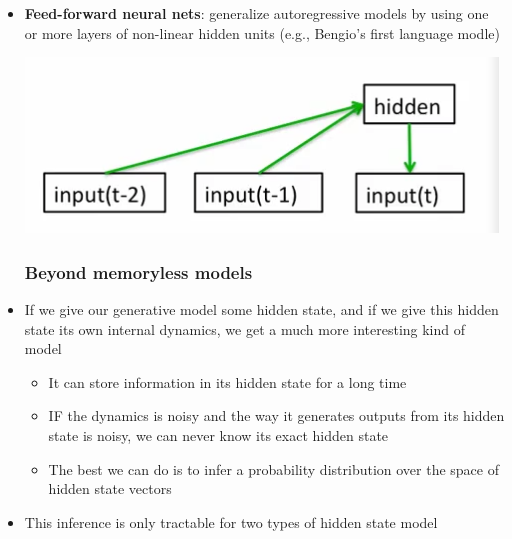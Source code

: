 \begin{itemize}
	\item \textbf{Feed-forward neural nets}: generalize autoregressive models by using one or more layers of non-linear hidden units (e.g., Bengio's first language modle)
	\begin{center}
		\includegraphics[scale=0.7]{sections/7/ffnn.png}
	\end{center}

	\subsubsection{Beyond memoryless models}
	\item If we give our generative model some hidden state, and if we give this hidden state its own internal dynamics, we get a much more interesting kind of model
	\begin{itemize}
		\item It can store information in its hidden state for a long time
		\item IF the dynamics is noisy and the way it generates outputs from its hidden state is noisy, we can never know its exact hidden state
		\item The best we can do is to infer a probability distribution over the space of hidden state vectors
	\end{itemize}
	\item This inference is only tractable for two types of hidden state model


\end{itemize}
